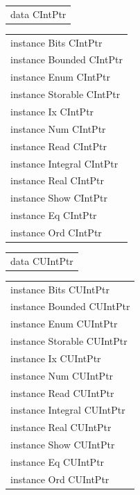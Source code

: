 \begin{haddockdesc}
\item[\begin{tabular}{@{}l}
data CIntPtr
\end{tabular}]
\end{haddockdesc}
\begin{haddockdesc}
\item[\begin{tabular}{@{}l}
instance Bits CIntPtr\\instance Bounded CIntPtr\\instance Enum CIntPtr\\instance Storable CIntPtr\\instance Ix CIntPtr\\instance Num CIntPtr\\instance Read CIntPtr\\instance Integral CIntPtr\\instance Real CIntPtr\\instance Show CIntPtr\\instance Eq CIntPtr\\instance Ord CIntPtr
\end{tabular}]
\end{haddockdesc}
\begin{haddockdesc}
\item[\begin{tabular}{@{}l}
data CUIntPtr
\end{tabular}]
\end{haddockdesc}
\begin{haddockdesc}
\item[\begin{tabular}{@{}l}
instance Bits CUIntPtr\\instance Bounded CUIntPtr\\instance Enum CUIntPtr\\instance Storable CUIntPtr\\instance Ix CUIntPtr\\instance Num CUIntPtr\\instance Read CUIntPtr\\instance Integral CUIntPtr\\instance Real CUIntPtr\\instance Show CUIntPtr\\instance Eq CUIntPtr\\instance Ord CUIntPtr
\end{tabular}]
\end{haddockdesc}
